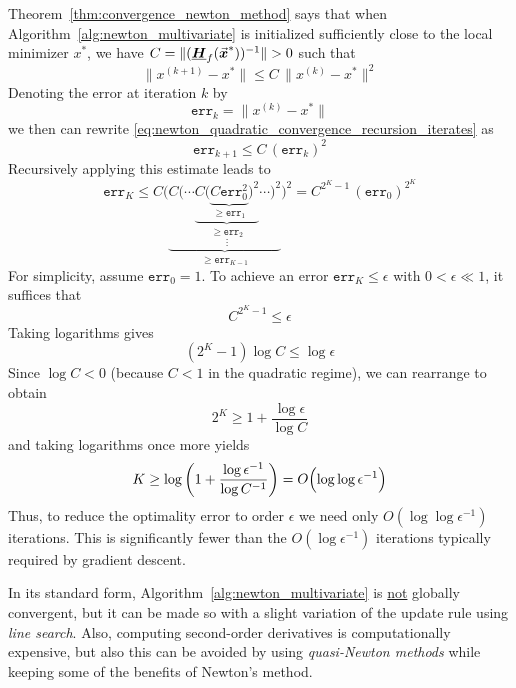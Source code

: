 Theorem~\ref{thm:convergence_newton_method} says that when Algorithm~\ref{alg:newton_multivariate} is initialized sufficiently close to the local minimizer \(x^{*}\), we have \(C = \|(\underline{\boldsymbol{H}}_{f}(\vec{\boldsymbol{x}}^{*}))^{-1}\| > 0\) such that
\begin{equation}\label{eq:newton_quadratic_convergence_recursion_iterates}
\|x^{(k+1)}-x^{*}\|\le C\,\|x^{(k)}-x^{*}\|^{2} %
\end{equation}
Denoting the error at iteration \(k\) by
\[
\texttt{err}_{k}=\|x^{(k)}-x^{*}\| %
\]
we then can rewrite \eqref{eq:newton_quadratic_convergence_recursion_iterates} as
\begin{equation}\label{eq:newton_quadratic_convergence_recursion_error}
\texttt{err}_{k+1}\le C\,(\texttt{err}_{k})^{2} %
\end{equation}
Recursively applying this estimate leads to
\[
\texttt{err}_{K} \le C \Bigg( 
\underbrace{
C \bigg( 
\underset{\vdots}{
\cdots 
\underbrace{
C \Big( 
\underbrace{
C \texttt{err}_{0}^{2} 
}_{\geq \texttt{err}_{1}}
\Big)^{2} 
}_{\geq \texttt{err}_{2}}
\cdots 
}
\bigg)^{2} 
}_{\geq \texttt{err}_{K-1}}
\Bigg)^{2}
=
C^{2^{K}-1}\,(\texttt{err}_{0})^{2^{K}} %
\]
For simplicity, assume \(\texttt{err}_{0}=1\). To achieve an error \(\texttt{err}_{K}\le\epsilon\) with \(0<\epsilon\ll 1\), it suffices that
\[
C^{2^{K}-1}\le \epsilon
\]
Taking logarithms gives
\[
\left(2^{K}-1\right)\log C \le \log \epsilon
\]
Since \(\log C<0\) (because \(C<1\) in the quadratic regime), we can rearrange to obtain
\[
2^{K}\ge 1+\frac{\log \epsilon}{\log C}
\]
and taking logarithms once more yields
\[
K \ge \log\left(1+\frac{\log \epsilon^{-1}}{\log C^{-1}}\right)=O\Bigl(\log \log \epsilon^{-1}\Bigr)
\]
Thus, to reduce the optimality error to order \(\epsilon\) we need only {\color{red}\(O(\log \log \epsilon^{-1})\)} iterations. 
This is significantly fewer than the \(O(\log \epsilon^{-1})\) iterations typically required by gradient descent.

In its standard form, Algorithm~\ref{alg:newton_multivariate} is \underline{not} globally convergent, but it can be made so with a slight variation of the update rule using \emph{line search}.
Also, computing second-order derivatives is computationally expensive, but also this can be avoided by using \emph{quasi-Newton methods} while keeping some of the benefits of Newton's method.
  











